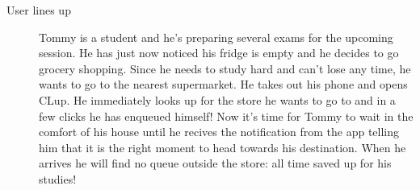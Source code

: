 \begin{description}
    \item[User lines up] 
    Tommy is a student and he’s preparing several exams for the upcoming session.
    He has just now noticed his fridge is empty and he decides to go grocery shopping. Since he needs to study hard and can't lose any time, he wants to go to the nearest supermarket. He takes out his phone and opens CLup. He immediately looks up for the store he wants to go to and in a few clicks he has enqueued himself! 
    Now it's time for Tommy to wait in the comfort of his house until he recives the notification from the app telling him that it is the right moment to head towards his destination. When he arrives he will find no queue outside the store: all time saved up for his studies!



\end{description}
